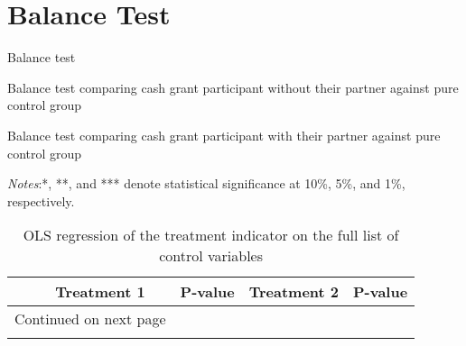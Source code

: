 \documentclass[10pt,a4paper]{article}
\begin{document}
\tableofcontents

\listoftables

\pagebreak

\section{Balance Test}

\begin{table}[H]\centering\caption{Balance test}
	\resizebox{\textwidth}{!}{}
\end{table}

\begin{table}[H]\centering\caption{Balance test comparing cash grant participant without their partner against pure control group}
\resizebox{\textwidth}{!}{}
\end{table}

\begin{table}[H]\centering\caption{Balance test comparing cash grant participant with their partner against pure control group}
	\resizebox{\textwidth}{!}{}
\end{table}



\begin{center}
	{\tiny \tabcolsep=1pt  %
		\begin{ThreePartTable}
			\begin{TableNotes}[flushleft]
				\tiny
				\item \textit{Notes}:*, **, and *** denote statistical significance at 10\%, 5\%, and 1\%, respectively.
			\end{TableNotes}
			\begin{longtable}{l*{4}{c}}
				\caption{OLS regression of the treatment indicator on the full list of control variables}\label{tab:balance_omni}					\\
				\toprule
				\hline 
				&\multicolumn{1}{p{2cm}}{\centering Treatment 1}
				&\multicolumn{1}{p{2cm}}{\centering P-value}
				&\multicolumn{1}{p{2cm}}{\centering Treatment 2}
				&\multicolumn{1}{p{2cm}}{\centering P-value} \\
				\hline 
				\endfirsthead
				\hline
				\endhead
				\hline
				\multicolumn{2}{r}{{Continued on next page}} \\
				\endfoot
				
				\bottomrule
				\insertTableNotes
				\endlastfoot
				
			\end{longtable}
		\end{ThreePartTable}
	}
\end{center}
\end{document}
